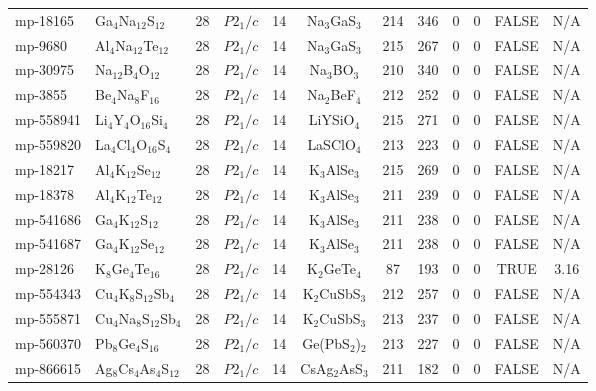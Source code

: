 {\begin{longtable}{llcccccccccc}
    mp-18165 & Ga$_{4}$Na$_{12}$S$_{12}$ & 28    & $P2_1/c$ & 14    & Na$_{3}$GaS$_{3}$ & 214   & 346   & 0     & 0     & FALSE & N/A \\
    mp-9680 & Al$_{4}$Na$_{12}$Te$_{12}$ & 28    & $P2_1/c$ & 14    & Na$_{3}$GaS$_{3}$ & 215   & 267   & 0     & 0     & FALSE & N/A \\
    mp-30975 & Na$_{12}$B$_{4}$O$_{12}$ & 28    & $P2_1/c$ & 14    & Na$_{3}$BO$_{3}$ & 210   & 340   & 0     & 0     & FALSE & N/A \\
    mp-3855 & Be$_{4}$Na$_{8}$F$_{16}$ & 28    & $P2_1/c$ & 14    & Na$_{2}$BeF$_{4}$ & 212   & 252   & 0     & 0     & FALSE & N/A \\
    mp-558941 & Li$_{4}$Y$_{4}$O$_{16}$Si$_{4}$ & 28    & $P2_1/c$ & 14    & LiYSiO$_{4}$ & 215   & 271   & 0     & 0     & FALSE & N/A \\
    mp-559820 & La$_{4}$Cl$_{4}$O$_{16}$S$_{4}$ & 28    & $P2_1/c$ & 14    & LaSClO$_{4}$ & 213   & 223   & 0     & 0     & FALSE & N/A \\
    mp-18217 & Al$_{4}$K$_{12}$Se$_{12}$ & 28    & $P2_1/c$ & 14    & K$_{3}$AlSe$_{3}$ & 215   & 269   & 0     & 0     & FALSE & N/A \\
    mp-18378 & Al$_{4}$K$_{12}$Te$_{12}$ & 28    & $P2_1/c$ & 14    & K$_{3}$AlSe$_{3}$ & 211   & 239   & 0     & 0     & FALSE & N/A \\
    mp-541686 & Ga$_{4}$K$_{12}$S$_{12}$ & 28    & $P2_1/c$ & 14    & K$_{3}$AlSe$_{3}$ & 211   & 238   & 0     & 0     & FALSE & N/A \\
    mp-541687 & Ga$_{4}$K$_{12}$Se$_{12}$ & 28    & $P2_1/c$ & 14    & K$_{3}$AlSe$_{3}$ & 211   & 238   & 0     & 0     & FALSE & N/A \\
    mp-28126 & K$_{8}$Ge$_{4}$Te$_{16}$ & 28    & $P2_1/c$ & 14    & K$_{2}$GeTe$_{4}$ & 87    & 193   & 0     & 0     & TRUE  & 3.16  \\
    mp-554343 & Cu$_{4}$K$_{8}$S$_{12}$Sb$_{4}$ & 28    & $P2_1/c$ & 14    & K$_{2}$CuSbS$_{3}$ & 212   & 257   & 0     & 0     & FALSE & N/A \\
    mp-555871 & Cu$_{4}$Na$_{8}$S$_{12}$Sb$_{4}$ & 28    & $P2_1/c$ & 14    & K$_{2}$CuSbS$_{3}$ & 213   & 237   & 0     & 0     & FALSE & N/A \\
    mp-560370 & Pb$_{8}$Ge$_{4}$S$_{16}$ & 28    & $P2_1/c$ & 14    & Ge(PbS$_{2}$)$_{2}$ & 213   & 227   & 0     & 0     & FALSE & N/A \\
    mp-866615 & Ag$_{8}$Cs$_{4}$As$_{4}$S$_{12}$ & 28    & $P2_1/c$ & 14    & CsAg$_{2}$AsS$_{3}$ & 211   & 182   & 0     & 0     & FALSE & N/A \\

\end{longtable}}
